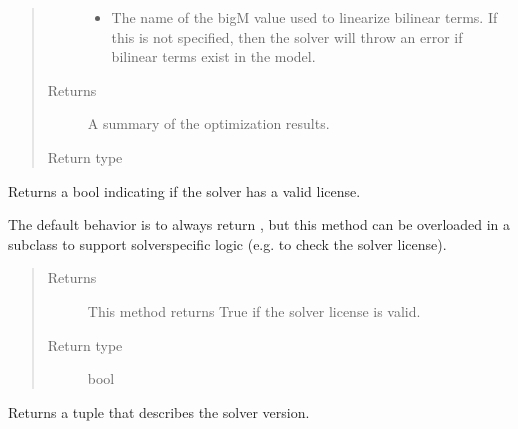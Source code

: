 \documentclass[letterpaper,10pt,english]{sphinxmanual}
\begin{document}
\begin{fulllineitems}
\begin{fulllineitems}
\begin{quote}
\begin{description}
\begin{itemize}
\item {} 
 \textendash{} The name of the big\sphinxhyphen{}M value used to linearize bilinear terms.  If this is not specified, then the solver will throw an error if bilinear terms exist in the model.

\end{itemize}

\item[{Returns}] \leavevmode
A summary of the optimization results.

\item[{Return type}] \leavevmode
{\hyperref[\detokenize{reference/solverapi:pao.common.solver.Results}]{}}

\end{description}\end{quote}

\end{fulllineitems}


\begin{fulllineitems}
\label{\detokenize{reference/pyomo:pao.pyomo.solvers.mpr_solvers.PyomoSubmodelSolver_MIBS.valid_license}}
Returns a bool indicating if the solver has a valid license.

The default behavior is to always return , but this method
can be overloaded in a subclass to support solver\sphinxhyphen{}specific logic
(e.g.  to check the solver license).
\begin{quote}\begin{description}
\item[{Returns}] \leavevmode
This method returns True if the solver license is valid.

\item[{Return type}] \leavevmode
bool

\end{description}\end{quote}

\end{fulllineitems}


\begin{fulllineitems}
\label{\detokenize{reference/pyomo:pao.pyomo.solvers.mpr_solvers.PyomoSubmodelSolver_MIBS.version}}
Returns a tuple that describes the solver version.


\end{fulllineitems}
\end{fulllineitems}
\end{document}
